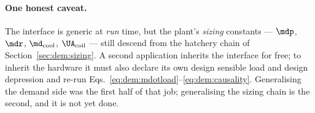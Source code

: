 \paragraph{One honest caveat.} The interface is generic at \emph{run} time, but
the plant's \emph{sizing} constants --- $\mdp$, $\mdr$, $\md_{\mathrm{cool}}$,
$\UA_{\mathrm{coil}}$ --- still descend from the hatchery chain of
Section~\ref{sec:dem:sizing}. A second application inherits the interface for
free; to inherit the hardware it must also declare its own design sensible load
and design depression and re-run Eqs.~\eqref{eq:dem:mdotload}--\eqref{eq:dem:causality}.
Generalising the demand side was the first half of that job; generalising the
sizing chain is the second, and it is not yet done.
